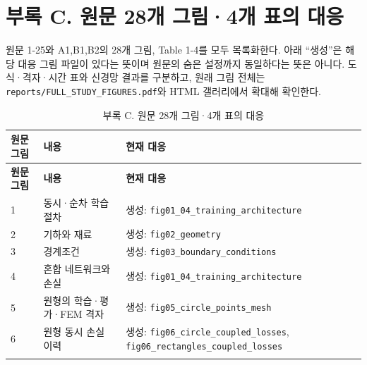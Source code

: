 \documentclass[10pt,a4paper]{article}
\renewcommand{\arraystretch}{1.25}
\begin{document}
\clearpage

\section{부록 C. 원문 28개 그림·4개 표의 대응}

원문 1-25와 A1,B1,B2의 28개 그림, Table 1-4를 모두 목록화한다. 아래 “생성”은 해당 대응 그림 파일이 있다는 뜻이며 원문의 숨은 설정까지 동일하다는 뜻은 아니다. 도식·격자·시간 표와 신경망 결과를 구분하고, 원래 그림 전체는 \nolinkurl{reports/FULL_STUDY_FIGURES.pdf}와 HTML 갤러리에서 확대해 확인한다.\par

\begingroup\fontsize{8}{10.5}\selectfont\renewcommand{\arraystretch}{1.1}

\begin{longtable}{>{\raggedright\arraybackslash}p{}>{\raggedright\arraybackslash}p{}>{\raggedright\arraybackslash}p{}}

\caption{부록 C. 원문 28개 그림·4개 표의 대응}\\

\rowcolor{tint} \textbf{원문 그림} & \textbf{내용} & \textbf{현재 대응}\\\midrule\endfirsthead

\rowcolor{tint} \textbf{원문 그림} & \textbf{내용} & \textbf{현재 대응}\\\midrule\endhead

\bottomrule\endfoot

1 & 동시·순차 학습 절차 & 생성: \nolinkurl{fig01_04_training_architecture}\\\addlinespace[1pt]

2 & 기하와 재료 & 생성: \nolinkurl{fig02_geometry}\\\addlinespace[1pt]

3 & 경계조건 & 생성: \nolinkurl{fig03_boundary_conditions}\\\addlinespace[1pt]

4 & 혼합 네트워크와 손실 & 생성: \nolinkurl{fig01_04_training_architecture}\\\addlinespace[1pt]

5 & 원형의 학습·평가·FEM 격자 & 생성: \nolinkurl{fig05_circle_points_mesh}\\\addlinespace[1pt]

6 & 원형 동시 손실 이력 & 생성: \nolinkurl{fig06_circle_coupled_losses}, \nolinkurl{fig06_rectangles_coupled_losses}\\\addlinespace[1pt]


\end{longtable}
\end{document}
